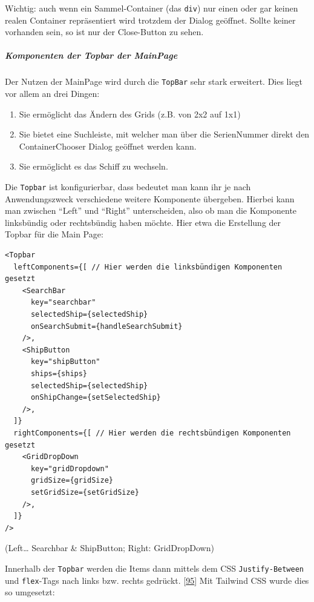 \documentclass[
    headings=optiontotocandhead,%
    twoside,
    numbers=noenddot,%
    12pt, %
    titlepage, %
    parskip=full, %
    listof=leveldown, 
    numbers=noenddot, %
    a4paper,DIV=14,
    BCOR=15mm,
]{scrbook}
\newcommand{\passthrough}[1]{#1}
\providecommand{\tightlist}{%
  \setlength{\itemsep}{0pt}\setlength{\parskip}{0pt}}
\begin{document}
Wichtig: auch wenn ein Sammel-Container (das
\passthrough{\lstinline!div!}) nur einen oder gar keinen realen
Container repräsentiert wird trotzdem der Dialog geöffnet. Sollte keiner
vorhanden sein, so ist nur der Close-Button zu sehen.

\hypertarget{komponenten-der-topbar-der-mainpage}{%
\subparagraph{Komponenten der Topbar der
MainPage}\label{komponenten-der-topbar-der-mainpage}}

Der Nutzen der MainPage wird durch die \passthrough{\lstinline!TopBar!}
sehr stark erweitert. Dies liegt vor allem an drei Dingen:

\begin{enumerate}
\def\labelenumi{\arabic{enumi}.}
\tightlist
\item
  Sie ermöglicht das Ändern des Grids (z.B. von 2x2 auf 1x1)
\item
  Sie bietet eine Suchleiste, mit welcher man über die SerienNummer
  direkt den ContainerChooser Dialog geöffnet werden kann.
\item
  Sie ermöglicht es das Schiff zu wechseln.
\end{enumerate}

Die \passthrough{\lstinline!Topbar!} ist konfigurierbar, dass bedeutet
man kann ihr je nach Anwendungszweck verschiedene weitere Komponente
übergeben. Hierbei kann man zwischen ``Left'' und ``Right''
unterscheiden, also ob man die Komponente linksbündig oder rechtsbündig
haben möchte. Hier etwa die Erstellung der Topbar für die Main Page:

\begin{lstlisting}[caption={Verschiedene Nutzung der Topbar Komponente in der MainPage}]
<Topbar
  leftComponents={[ // Hier werden die linksbündigen Komponenten gesetzt
    <SearchBar 
      key="searchbar" 
      selectedShip={selectedShip} 
      onSearchSubmit={handleSearchSubmit} 
    />,
    <ShipButton
      key="shipButton"
      ships={ships}
      selectedShip={selectedShip}
      onShipChange={setSelectedShip}
    />,
  ]}
  rightComponents={[ // Hier werden die rechtsbündigen Komponenten gesetzt
    <GridDropDown 
      key="gridDropdown" 
      gridSize={gridSize} 
      setGridSize={setGridSize} 
    />,
  ]}
/>
\end{lstlisting}

(Left\ldots{} Searchbar \& ShipButton; Right: GridDropDown)

Innerhalb der \passthrough{\lstinline!Topbar!} werden die Items dann
mittels dem CSS \passthrough{\lstinline!Justify-Between!} und
\passthrough{\lstinline!flex!}-Tags nach links bzw. rechts gedrückt.
{[}\protect\hyperlink{ref-DeveloperMozilla-JustifyContent}{95}{]} Mit
Tailwind CSS wurde dies so umgesetzt:
\end{document}
